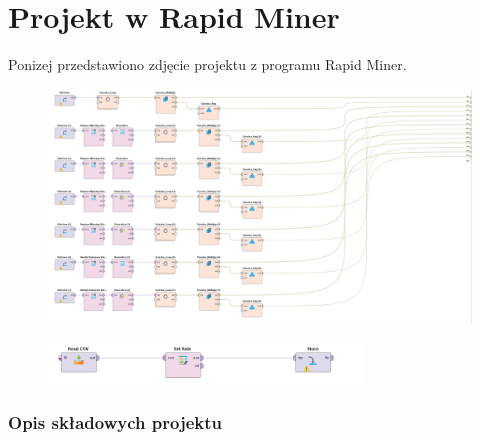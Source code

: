\documentclass[12pt,oneside,a4paper]{book} %
\theoremstyle{break}
\begin{document}
\chapter*{Projekt w Rapid Miner}

Ponizej przedstawiono zdjęcie projektu z programu Rapid Miner.

\begin{figure}[H]
  \centering
  \includegraphics[width=1\textwidth]{whole-project.png}
\end{figure}
\begin{figure}[H]
  \centering
  \includegraphics[width=0.75\textwidth]{loading-project.png}
\end{figure}

\subsection*{Opis składowych projektu}
\end{document}
